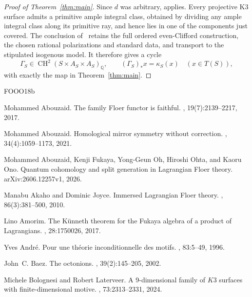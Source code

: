 \documentclass[11pt]{article}
\numberwithin{equation}{section}
\theoremstyle{definition}
\theoremstyle{remark}
\newcommand{\Q}{\mathbb Q}
\newcommand{\CH}{\operatorname{CH}}
\begin{document}
\begin{proof}[Proof of Theorem~\ref{thm:main}]
Since $d$ was arbitrary, \cite[Corollary~1.3]{R} applies.
Every projective K3 surface admits a primitive ample integral
class, obtained by dividing any ample integral class along its
primitive ray, and hence lies in one of the components just
covered. The conclusion of~\cite{R} retains the full ordered
even-Clifford construction, the chosen rational polarizations and
standard data, and transport to the stipulated isogenous model.
It therefore gives a cycle
\[
 \Gamma_S\in\CH^2(S\times A_S\times A_S)_\Q,
 \qquad (\Gamma_S)_*x=\kappa_S(x)\quad(x\in T(S)),
\]
with exactly the map in Theorem~\ref{thm:main}.
\end{proof}


\begin{thebibliography}{FOOO18b}

Mohammed Abouzaid.
\newblock The family {Floer} functor is faithful.
, 19(7):2139--2217,
  2017.

Mohammed Abouzaid.
\newblock Homological mirror symmetry without correction.
, 34(4):1059--1173,
  2021.

Mohammed Abouzaid, Kenji Fukaya, Yong-Geun Oh, Hiroshi Ohta, and Kaoru Ono.
\newblock Quantum cohomology and split generation in {Lagrangian Floer} theory.
\newblock arXiv:2606.12257v1, 2026.

Manabu Akaho and Dominic Joyce.
\newblock Immersed {Lagrangian Floer} theory.
, 86(3):381--500, 2010.

Lino Amorim.
\newblock The {K\"unneth} theorem for the {Fukaya} algebra of a product of
  {Lagrangians}.
, 28:1750026, 2017.

Yves Andr{\'e}.
\newblock Pour une th{\'e}orie inconditionnelle des motifs.
, 83:5--49, 1996.

John~C. Baez.
\newblock The octonions.
, 39(2):145--205,
  2002.

Michele Bolognesi and Robert Laterveer.
\newblock A 9-dimensional family of {$K3$} surfaces with finite-dimensional
  motive.
,
  73:2313--2331, 2024.


\end{thebibliography}
\end{document}
